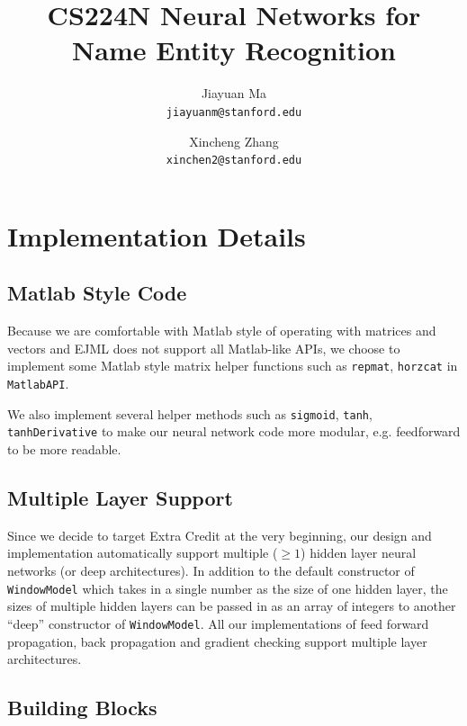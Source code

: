 \documentclass[letterpaper]{article}
\begin{document}
\title{CS224N Neural Networks for Name Entity Recognition}
\author{
        Jiayuan Ma \\
        \texttt{jiayuanm@stanford.edu}
        \and
        Xincheng Zhang\\
        \texttt{xinchen2@stanford.edu}
}
\maketitle


\section{Implementation Details}

\subsection{Matlab Style Code}
Because we are comfortable with Matlab style of operating with matrices and vectors and EJML does not support all Matlab-like APIs, we choose to implement some Matlab style matrix helper functions such as \texttt{repmat}, \texttt{horzcat} in \texttt{MatlabAPI}.

\vspace{0.1cm}

We also implement several helper methods such as \texttt{sigmoid}, \texttt{tanh}, \texttt{tanhDerivative} to make our neural network code more modular, e.g. feedforward to be more readable.

\subsection{Multiple Layer Support}
Since we decide to target Extra Credit at the very beginning, our design and implementation automatically support multiple ($\ge 1$) hidden layer neural networks (or deep architectures). In addition to the default constructor of \texttt{WindowModel} which takes in a single number as the size of one hidden layer, the sizes of multiple hidden layers can be passed in as an array of integers to another ``deep'' constructor of \texttt{WindowModel}. All our implementations of feed forward propagation, back propagation and gradient checking support multiple layer architectures.  

\subsection{Building Blocks}
\end{document}
